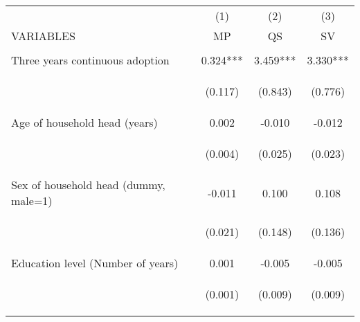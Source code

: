 \begin{center}
\begin{tabular}{lccc} \hline
 & (1) & (2) & (3) \\
VARIABLES & MP & QS & SV \\ \hline
\vspace{4pt} & \begin{footnotesize}\end{footnotesize} & \begin{footnotesize}\end{footnotesize} & \begin{footnotesize}\end{footnotesize} \\
Three years continuous adoption & 0.324*** & 3.459*** & 3.330*** \\
\vspace{4pt} & \begin{footnotesize}(0.117)\end{footnotesize} & \begin{footnotesize}(0.843)\end{footnotesize} & \begin{footnotesize}(0.776)\end{footnotesize} \\
Age of household head (years) & 0.002 & -0.010 & -0.012 \\
\vspace{4pt} & \begin{footnotesize}(0.004)\end{footnotesize} & \begin{footnotesize}(0.025)\end{footnotesize} & \begin{footnotesize}(0.023)\end{footnotesize} \\
Sex of household head (dummy, male=1) & -0.011 & 0.100 & 0.108 \\
\vspace{4pt} & \begin{footnotesize}(0.021)\end{footnotesize} & \begin{footnotesize}(0.148)\end{footnotesize} & \begin{footnotesize}(0.136)\end{footnotesize} \\
Education level (Number of years) & 0.001 & -0.005 & -0.005 \\
\vspace{4pt} & \begin{footnotesize}(0.001)\end{footnotesize} & \begin{footnotesize}(0.009)\end{footnotesize} & \begin{footnotesize}(0.009)\end{footnotesize} \\

\end{tabular}
\end{center}
